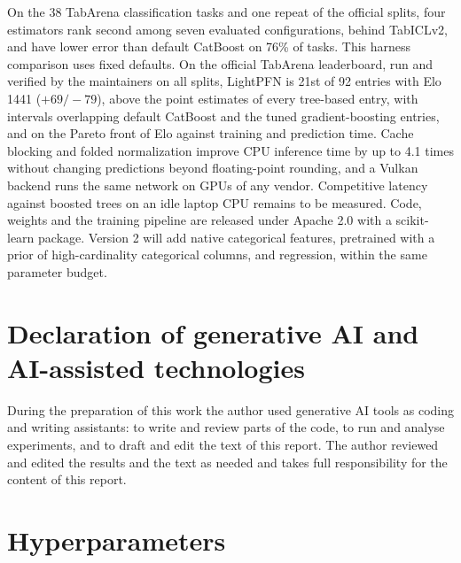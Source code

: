 \documentclass[11pt]{article}
\begin{document}
On the 38 TabArena classification tasks and one repeat of the official splits, four estimators rank
second among seven evaluated configurations, behind TabICLv2, and have lower error than default
CatBoost on 76\% of tasks. This harness comparison uses fixed defaults. On the official TabArena
leaderboard, run and verified by the maintainers on all splits, LightPFN is 21st of 92 entries with Elo 1441
($+69/-79$), above the point estimates of every tree-based entry, with intervals overlapping default CatBoost
and the tuned gradient-boosting entries, and on the Pareto front of Elo against training and prediction time.
Cache blocking and folded normalization improve CPU inference time by up to 4.1 times without changing
predictions beyond floating-point rounding, and a Vulkan backend runs the same network on GPUs of any vendor.
Competitive latency against boosted trees on an idle laptop CPU remains to be measured. Code, weights and the
training pipeline are released under Apache 2.0 with a scikit-learn package. Version 2 will add native categorical
features, pretrained with a prior of high-cardinality categorical columns, and regression, within the same
parameter budget.

\section*{Declaration of generative AI and AI-assisted technologies}
During the preparation of this work the author used generative AI tools as coding and writing assistants: to
write and review parts of the code, to run and analyse experiments, and to draft and edit the text of this
report. The author reviewed and edited the results and the text as needed and takes full responsibility for the
content of this report.

\clearpage
\appendix
\section{Hyperparameters}
\end{document}
